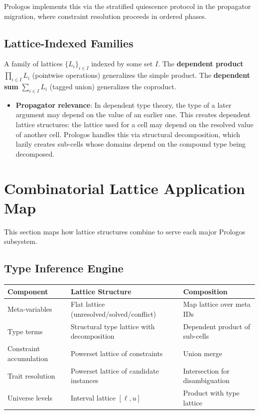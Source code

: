 \documentclass[11pt]{article}
\begin{document}
Prologos implements this via the stratified quiescence protocol in the propagator
migration, where constraint resolution proceeds in ordered phases.
\subsection{Lattice-Indexed Families}
\label{sec:org7af5db9}

A family of lattices \(\{L_i\}_{i \in I}\) indexed by some set \(I\). The \textbf{dependent
product} \(\prod_{i \in I} L_i\) (pointwise operations) generalizes the simple
product. The \textbf{dependent sum} \(\sum_{i \in I} L_i\) (tagged union) generalizes the
coproduct.

\begin{itemize}
\item \textbf{Propagator relevance}: In dependent type theory, the type of a later argument
may depend on the value of an earlier one. This creates dependent lattice
structures: the lattice used for a cell may depend on the resolved value of
another cell. Prologos handles this via structural decomposition, which
lazily creates sub-cells whose domains depend on the compound type being
decomposed.
\end{itemize}
\section{Combinatorial Lattice Application Map}
\label{sec:orgda389d4}

This section maps how lattice structures combine to serve each major Prologos
subsystem.
\subsection{Type Inference Engine}
\label{sec:orgaecb7b6}

\begin{center}
\begin{tabular}{lll}
Component & Lattice Structure & Composition\\
\hline
Meta-variables & Flat lattice (unresolved/solved/conflict) & Map lattice over meta IDs\\
Type terms & Structural type lattice with decomposition & Dependent product of sub-cells\\
Constraint accumulation & Powerset lattice of constraints & Union merge\\
Trait resolution & Powerset lattice of candidate instances & Intersection for disambiguation\\
Universe levels & Interval lattice \([\ell, u]\) & Product with type lattice\\
\end{tabular}
\end{center}
\end{document}
